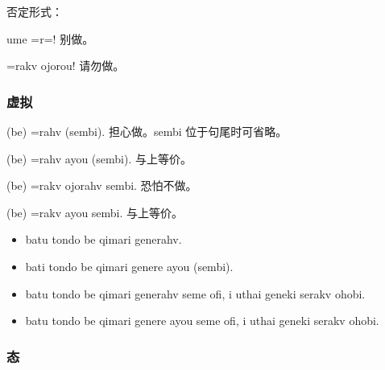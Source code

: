 否定形式：

\begin{des}
    \item[ume \V=r=\AIfina !] 别做\V 。
    \item[\V=rakv ojorou!] 请勿做\V 。 
\end{des}

\subsubsection{虚拟}

\begin{des}
    \item[\A \B (be) \V=rahv (sembi).] \A 担心\B 做\V 。sembi 位于句尾时可省略。
    \item[\A \B (be) \V=rahv ayou (sembi).] 与上等价。
    \item[\A \B (be) \V=rakv ojorahv sembi.]  \A 恐怕\B 不做\V 。
    \item[\A \B (be) \V=rakv ayou sembi.] 与上等价。 
    \begin{itemize}
        \item batu tondo be qimari generahv.
        \item bati tondo be qimari genere ayou (sembi).
        \item batu tondo be qimari generahv seme ofi, i uthai geneki serakv ohobi.
        \item batu tondo be qimari genere ayou seme ofi, i uthai geneki serakv ohobi.
    \end{itemize}
\end{des}

\subsubsection{态}

